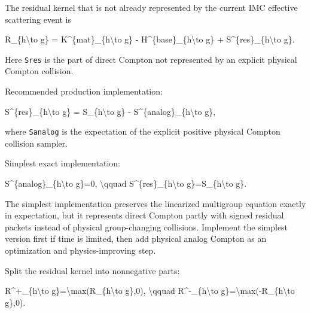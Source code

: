 \documentclass[
]{article}
\newenvironment{Shaded}{}{}
\newcommand{\NormalTok}[1]{#1}
\begin{document}
The residual kernel that is not already represented by the current IMC
effective scattering event is

\begin{Shaded}
\begin{Highlighting}[]
\NormalTok{R\_\{h\textbackslash{}to g\} = K\^{}\{mat\}\_\{h\textbackslash{}to g\} {-} H\^{}\{base\}\_\{h\textbackslash{}to g\} + S\^{}\{res\}\_\{h\textbackslash{}to g\}.}
\end{Highlighting}
\end{Shaded}

Here \texttt{Sres} is the part of direct Compton not represented by an
explicit physical Compton collision.

Recommended production implementation:

\begin{Shaded}
\begin{Highlighting}[]
\NormalTok{S\^{}\{res\}\_\{h\textbackslash{}to g\} = S\_\{h\textbackslash{}to g\} {-} S\^{}\{analog\}\_\{h\textbackslash{}to g\},}
\end{Highlighting}
\end{Shaded}

where \texttt{Sanalog} is the expectation of the explicit positive
physical Compton collision sampler.

Simplest exact implementation:

\begin{Shaded}
\begin{Highlighting}[]
\NormalTok{S\^{}\{analog\}\_\{h\textbackslash{}to g\}=0,}
\NormalTok{\textbackslash{}qquad}
\NormalTok{S\^{}\{res\}\_\{h\textbackslash{}to g\}=S\_\{h\textbackslash{}to g\}.}
\end{Highlighting}
\end{Shaded}

The simplest implementation preserves the linearized multigroup equation
exactly in expectation, but it represents direct Compton partly with
signed residual packets instead of physical group-changing collisions.
Implement the simplest version first if time is limited, then add
physical analog Compton as an optimization and physics-improving step.

Split the residual kernel into nonnegative parts:

\begin{Shaded}
\begin{Highlighting}[]
\NormalTok{R\^{}+\_\{h\textbackslash{}to g\}=\textbackslash{}max(R\_\{h\textbackslash{}to g\},0),}
\NormalTok{\textbackslash{}qquad}
\NormalTok{R\^{}{-}\_\{h\textbackslash{}to g\}=\textbackslash{}max({-}R\_\{h\textbackslash{}to g\},0).}
\end{Highlighting}
\end{Shaded}
\end{document}
